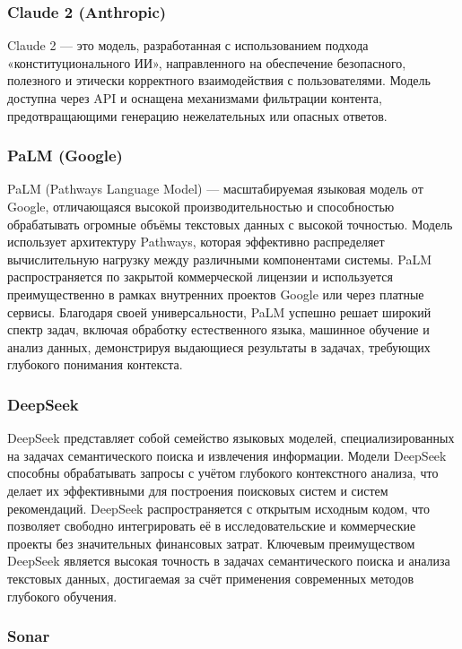 \subsubsection{Claude 2 (Anthropic)}
Claude 2 \cite{lib:Claude} — это модель, разработанная с использованием подхода «конституционального ИИ», направленного на обеспечение безопасного, полезного и этически корректного взаимодействия с пользователями. Модель доступна через API и оснащена механизмами фильтрации контента, предотвращающими генерацию нежелательных или опасных ответов.

\subsubsection{PaLM (Google)}

PaLM (Pathways Language Model) \cite{lib:palm} — масштабируемая языковая модель от Google, отличающаяся высокой производительностью и способностью обрабатывать огромные объёмы текстовых данных с высокой точностью. Модель использует архитектуру Pathways, которая эффективно распределяет вычислительную нагрузку между различными компонентами системы. PaLM распространяется по закрытой коммерческой лицензии и используется преимущественно в рамках внутренних проектов Google или через платные сервисы. Благодаря своей универсальности, PaLM успешно решает широкий спектр задач, включая обработку естественного языка, машинное обучение и анализ данных, демонстрируя выдающиеся результаты в задачах, требующих глубокого понимания контекста.

\subsubsection{DeepSeek}

DeepSeek \cite{lib:DeepSeek} представляет собой семейство языковых моделей, специализированных на задачах семантического поиска и извлечения информации. Модели DeepSeek способны обрабатывать запросы с учётом глубокого контекстного анализа, что делает их эффективными для построения поисковых систем и систем рекомендаций. DeepSeek распространяется с открытым исходным кодом, что позволяет свободно интегрировать её в исследовательские и коммерческие проекты без значительных финансовых затрат. Ключевым преимуществом DeepSeek является высокая точность в задачах семантического поиска и анализа текстовых данных, достигаемая за счёт применения современных методов глубокого обучения.

\subsubsection{Sonar}

